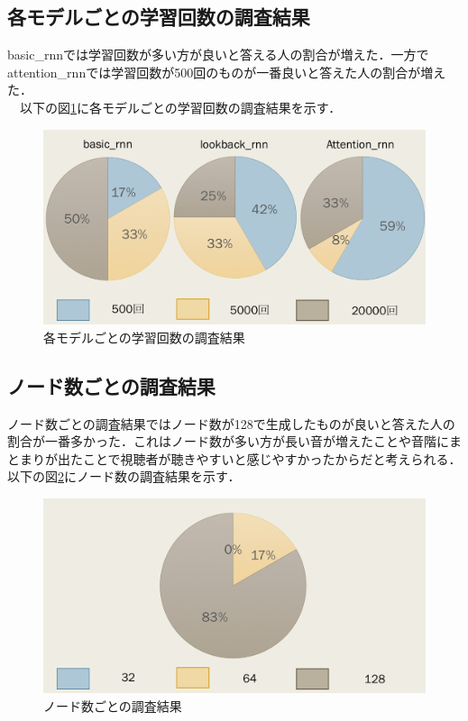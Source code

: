 \subsection{各モデルごとの学習回数の調査結果}
basic\_rnnでは学習回数が多い方が良いと答える人の割合が増えた．一方でattention\_rnnでは学習回数が500回のものが一番良いと答えた人の割合が増えた．\\
　以下の図\ref{fig:各モデルごとの学習回数の調査結果}に各モデルごとの学習回数の調査結果を示す．
\begin{figure}[h]
    \begin{screen}
    \begin{center}
        \includegraphics[scale=0.6, clip]{./img/glaph2.png}
        \caption{各モデルごとの学習回数の調査結果}
        \label{fig:各モデルごとの学習回数の調査結果}
    \end{center}
    \end{screen}
\end{figure}
\newpage
\subsection{ノード数ごとの調査結果}
ノード数ごとの調査結果ではノード数が128で生成したものが良いと答えた人の割合が一番多かった．これはノード数が多い方が長い音が増えたことや音階にまとまりが出たことで視聴者が聴きやすいと感じやすかったからだと考えられる．\\
以下の図\ref{fig:ノード数の調査結果}にノード数の調査結果を示す．\\
\begin{figure}[h]
    \begin{screen}
    \begin{center}
        \includegraphics[scale=0.6, clip]{./img/glaph3.png}
        \caption{ノード数ごとの調査結果}
        \label{fig:ノード数の調査結果}
    \end{center}
    \end{screen}
\end{figure}
\newpage
\newpage
